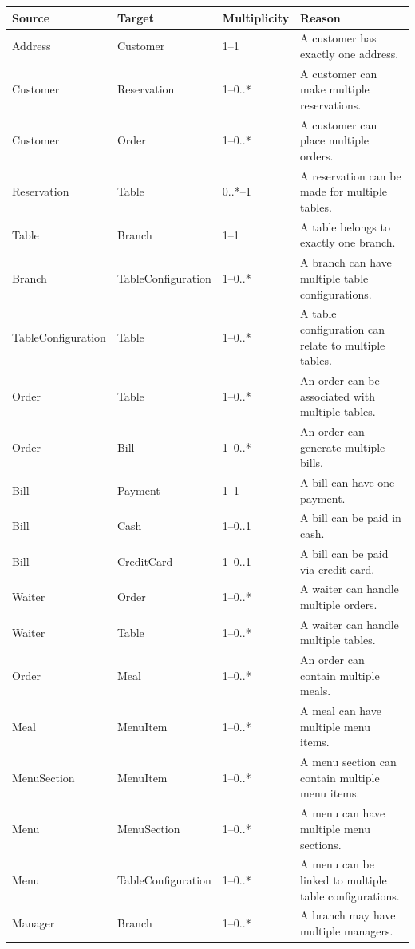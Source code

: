 \begin{table}[h!]
\centering
\begin{tabular}{|p{3.5cm}|p{3.5cm}|p{3cm}|p{6.5cm}|}
\hline
\textbf{Source} & \textbf{Target} & \textbf{Multiplicity} & \textbf{Reason} \\
\hline
Address & Customer & 1--1 & A customer has exactly one address. \\
\hline
Customer & Reservation & 1--0..* & A customer can make multiple reservations. \\
\hline
Customer & Order & 1--0..* & A customer can place multiple orders. \\
\hline
Reservation & Table & 0..*--1 & A reservation can be made for multiple tables. \\
\hline
Table & Branch & 1--1 & A table belongs to exactly one branch. \\
\hline
Branch & TableConfiguration & 1--0..* & A branch can have multiple table configurations. \\
\hline
TableConfiguration & Table & 1--0..* & A table configuration can relate to multiple tables. \\
\hline
Order & Table & 1--0..* & An order can be associated with multiple tables. \\
\hline
Order & Bill & 1--0..* & An order can generate multiple bills. \\
\hline
Bill & Payment & 1--1 & A bill can have one payment. \\
\hline
Bill & Cash & 1--0..1 & A bill can be paid in cash. \\
\hline
Bill & CreditCard & 1--0..1 & A bill can be paid via credit card. \\
\hline
Waiter & Order & 1--0..* & A waiter can handle multiple orders. \\
\hline
Waiter & Table & 1--0..* & A waiter can handle multiple tables. \\
\hline
Order & Meal & 1--0..* & An order can contain multiple meals. \\
\hline
Meal & MenuItem & 1--0..* & A meal can have multiple menu items. \\
\hline
MenuSection & MenuItem & 1--0..* & A menu section can contain multiple menu items. \\
\hline
Menu & MenuSection & 1--0..* & A menu can have multiple menu sections. \\
\hline
Menu & TableConfiguration & 1--0..* & A menu can be linked to multiple table configurations. \\
\hline
Manager & Branch & 1--0..* & A branch may have multiple managers. \\

\end{tabular}
\end{table}
